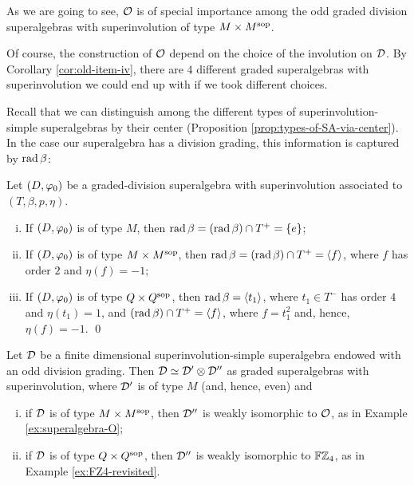 As we are going to see, $\mathcal O$ is of special importance among the odd graded division superalgebras with superinvolution of type $M\times M^{\mathrm{sop}}$.

Of course, the construction of $\mathcal O$ depend on the choice of the involution on $\mathcal{D}$. 
By Corollary \ref{cor:old-item-iv}, there are $4$ different graded superalgebras with superinvolution we could end up with if we took different choices.


Recall that we can distinguish among the different types of superinvolution-simple superalgebras by their center (Proposition \ref{prop:types-of-SA-via-center}). 
In the case our superalgebra has a division grading, this information is captured by $\operatorname{rad} \beta$:

\begin{lemma}\label{lemma:types-of-D-via-rad-beta}
    Let $(D, \varphi_0)$ be a graded-division superalgebra with superinvolution associated to $(T, \beta, p, \eta)$.
    \begin{enumerate}[(i)]
        \item If $(D, \varphi_0)$ is of type $M$, then $\operatorname{rad} \beta = (\operatorname{rad} \beta) \cap T^+ = \{e\}$;
        \item If $(D, \varphi_0)$ is of type $M\times M^{\mathrm{sop}}$, then $\operatorname{rad} \beta = (\operatorname{rad} \beta) \cap T^+ = \langle f \rangle$, where $f$ has order $2$ and $\eta(f) = -1$;
        \item If $(D, \varphi_0)$ is of type $Q\times Q^{\mathrm{sop}}$, then $\operatorname{rad} \beta = \langle t_1 \rangle$, where $t_1 \in T^-$ has order $4$ and $\eta(t_1) = 1$, and $(\operatorname{rad} \beta) \cap T^+ = \langle f \rangle$, where $f = t_1^2$ and, hence, $\eta(f) = -1$. \qed
    \end{enumerate}
\end{lemma}

\begin{thm}
    Let $\mathcal{D}$ be a finite dimensional superinvolution-simple superalgebra endowed with an odd division grading. 
    Then $\mathcal{D} \simeq \mathcal{D}' \otimes \mathcal{D}''$ as graded superalgebras with superinvolution, where $\mathcal{D}'$ is of type $M$ (and, hence, even) and
    \begin{enumerate}[(i)]
        \item if $\mathcal{D}$ is of type $M\times M^{\mathrm{sop}}$, then $\mathcal{D}''$ is weakly isomorphic to $\mathcal O$, as in Example \ref{ex:superalgebra-O};
        \item if $\mathcal{D}$ is of type $Q\times Q^{\mathrm{sop}}$, then $\mathcal{D}''$ is weakly isomorphic to $\mathbb{F}\mathbb{Z}_4$, as in Example \ref{ex:FZ4-revisited}.
    \end{enumerate}
\end{thm}

